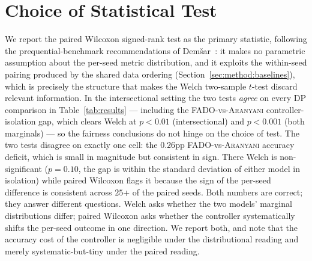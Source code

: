 \documentclass[sigconf,anonymous,review]{acmart}
\begin{document}
\section{Choice of Statistical Test}
\label{app:tests}
We report the paired Wilcoxon signed-rank test as the primary statistic, following the prequential-benchmark recommendations of
Dem\v{s}ar~\cite{demsar2006statistical}: it makes no parametric assumption about the per-seed metric distribution, and it exploits the within-seed pairing
produced by the shared data ordering (Section~\ref{sec:method:baselines}), which is precisely the structure that makes the Welch two-sample $t$-test
discard relevant information. In the intersectional setting the two tests \emph{agree} on every DP comparison in Table~\ref{tab:results} --- including the
\textsc{FADO}-vs-\textsc{Aranyani} controller-isolation gap, which clears Welch at $p<0.01$ (intersectional) and $p<0.001$ (both marginals) --- so the
fairness conclusions do not hinge on the choice of test. The two tests disagree on exactly one cell: the $0.26$pp \textsc{FADO}-vs-\textsc{Aranyani} accuracy
deficit, which is small in magnitude but consistent in sign. There Welch is non-significant ($p=0.10$, the gap is within the standard deviation of either model
in isolation) while paired Wilcoxon flags it because the sign of the per-seed difference is consistent across $25$+ of the paired seeds. Both numbers are
correct; they answer different questions. Welch asks whether the two models' marginal distributions differ; paired Wilcoxon asks whether the controller
systematically shifts the per-seed outcome in one direction. We report both, and note that the accuracy cost of the controller is negligible under the
distributional reading and merely systematic-but-tiny under the paired reading.
\end{document}
